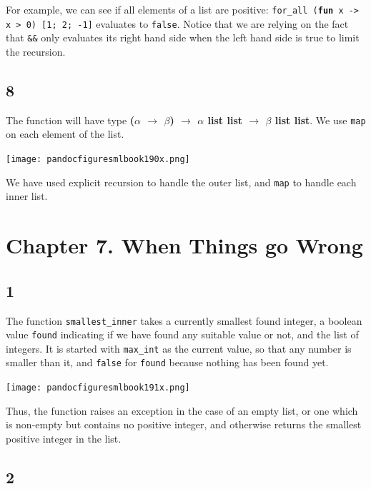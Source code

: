 \documentclass[]{book}
\begin{document}
\noindent For example, we can see if all elements of a list are positive: \texttt{for\_all (}\textbf{\texttt{fun}}\texttt{ x -> x > 0) [1; 2; -1]} evaluates to \texttt{false}. Notice that we are relying on the fact that \verb!&&! only evaluates its right hand side when the left hand side is true to limit the recursion.

\subsection*{8}
The function will have type \textbf{\textsf{\textmd{(}$\alpha$ $\rightarrow$ $\beta$\textmd{)} $\rightarrow$ $\alpha$ list list $\rightarrow$ $\beta$ list list}}. We use \texttt{map} on each element of the list.

\medskip
\begin{center}
\noindent\texttt{[image: pandocfiguresmlbook190x.png]}
\end{center}
\medskip

\noindent We have used explicit recursion to handle the outer list, and \texttt{map} to handle each inner list.
\section*{Chapter 7. When Things go Wrong}

\subsection*{1}

The function \texttt{smallest\_inner} takes a currently smallest found integer, a boolean value \texttt{found} indicating if we have found any suitable value or not, and the list of integers. It is started with \texttt{max\_int} as the current value, so that any number is smaller than it, and \texttt{false} for \texttt{found} because nothing has been found yet.

\medskip
\begin{center}
\noindent\texttt{[image: pandocfiguresmlbook191x.png]}
\end{center}
\medskip

\noindent Thus, the function raises an exception in the case of an empty list, or one which is non-empty but contains no positive integer, and otherwise returns the smallest positive integer in the list.

\subsection*{2}
\end{document}
